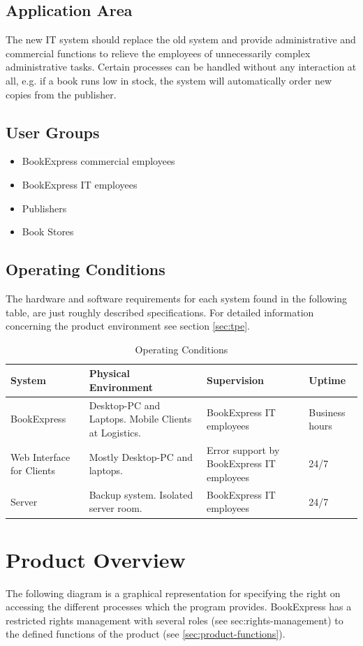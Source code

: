\documentclass[11pt,a4paper,oneside,svgnames]{report}
\begin{document}
\section{Application Area}
The new IT system should replace the old system and provide administrative and commercial functions to relieve the employees of unnecessarily complex administrative tasks. Certain processes can be handled without any interaction at all, e.g. if a book runs low in stock, the system will automatically order new copies from the publisher. 
\section{User Groups}
\begin{itemize}
\item BookExpress commercial employees
\item BookExpress IT employees
\item Publishers
\item Book Stores
\end{itemize}
\section{Operating Conditions}

The hardware and software requirements for each system found in the following table, are just roughly described specifications. For detailed information concerning the product environment see section \ref{sec:tpe}.

\begin{table}[H]
\centering
\begin{tabular}{p{2.5cm}p{4.5cm}p{4cm}p{1.5cm}}
\rowcolor{white} \textbf{System} & \textbf{Physical Environment} & \textbf{Supervision} & \textbf{Uptime}\\
\hline
\cellcolor{white} BookExpress & Desktop-PC and Laptops. Mobile Clients at Logistics. & BookExpress IT employees & Business hours\\
\cellcolor{white} Web Interface for Clients & Mostly Desktop-PC and laptops. & Error support by BookExpress IT employees & 24/7\\
\cellcolor{white} Server & Backup system. Isolated server room. & BookExpress IT employees & 24/7\\
\end{tabular}
\caption{Operating Conditions}
\label{tab:opcon}
\end{table}

\chapter{Product Overview}
The following diagram is a graphical representation for specifying the right on accessing the different processes which the program provides.
BookExpress has a restricted rights management with several roles (see {sec:rights-management}) to the defined functions of the product (see \ref{sec:product-functions}).
\end{document}
